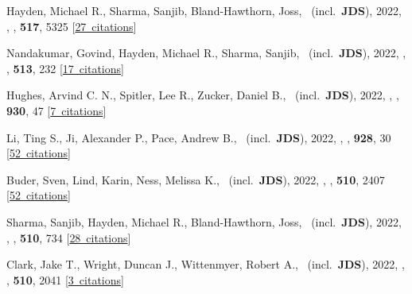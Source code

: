 \item[{\color{numcolor}\scriptsize74}] Hayden, Michael R., Sharma, Sanjib, Bland-Hawthorn, Joss, \etal\ (incl.\ \textbf{JDS}), 2022, , \mnras, \textbf{517}, 5325 [\href{https://ui.adsabs.harvard.edu/#abs/2022MNRAS.517.5325H}{27~citations}]

\item[{\color{numcolor}\scriptsize73}] Nandakumar, Govind, Hayden, Michael R., Sharma, Sanjib, \etal\ (incl.\ \textbf{JDS}), 2022, , \mnras, \textbf{513}, 232 [\href{https://ui.adsabs.harvard.edu/#abs/2022MNRAS.513..232N}{17~citations}]

\item[{\color{numcolor}\scriptsize72}] Hughes, Arvind C. N., Spitler, Lee R., Zucker, Daniel B., \etal\ (incl.\ \textbf{JDS}), 2022, , \apj, \textbf{930}, 47 [\href{https://ui.adsabs.harvard.edu/#abs/2022ApJ...930...47H}{7~citations}]

\item[{\color{numcolor}\scriptsize71}] Li, Ting S., Ji, Alexander P., Pace, Andrew B., \etal\ (incl.\ \textbf{JDS}), 2022, , \apj, \textbf{928}, 30 [\href{https://ui.adsabs.harvard.edu/#abs/2022ApJ...928...30L}{52~citations}]

\item[{\color{numcolor}\scriptsize70}] Buder, Sven, Lind, Karin, Ness, Melissa K., \etal\ (incl.\ \textbf{JDS}), 2022, , \mnras, \textbf{510}, 2407 [\href{https://ui.adsabs.harvard.edu/#abs/2022MNRAS.510.2407B}{52~citations}]

\item[{\color{numcolor}\scriptsize69}] Sharma, Sanjib, Hayden, Michael R., Bland-Hawthorn, Joss, \etal\ (incl.\ \textbf{JDS}), 2022, , \mnras, \textbf{510}, 734 [\href{https://ui.adsabs.harvard.edu/#abs/2022MNRAS.510..734S}{28~citations}]

\item[{\color{numcolor}\scriptsize68}] Clark, Jake T., Wright, Duncan J., Wittenmyer, Robert A., \etal\ (incl.\ \textbf{JDS}), 2022, , \mnras, \textbf{510}, 2041 [\href{https://ui.adsabs.harvard.edu/#abs/2022MNRAS.510.2041C}{3~citations}]

